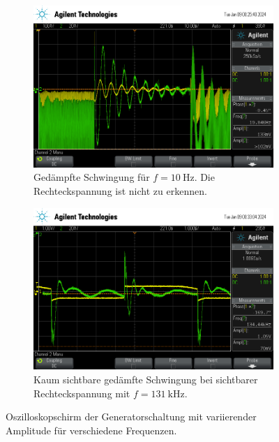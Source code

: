 \begin{figure}
  \begin{subfigure}[c]{0.49\textwidth}
    \centering
    \includegraphics[width=\textwidth]{content/scope/scope_19.png}
    \caption{Gedämpfte Schwingung für $f=\qty{10}{\hertz}$. Die Rechteckspannung ist nicht zu erkennen.}
    \label{fig:scope_generator2_a}
  \end{subfigure}
  \begin{subfigure}[c]{0.49\textwidth}
    \centering
    \includegraphics[width=\textwidth]{content/scope/scope_20.png}
    \caption{Kaum sichtbare gedämfte Schwingung bei sichtbarer Rechteckspannung mit $f=\qty{131}{\kilo\hertz}$.}
  \end{subfigure}
  \caption{Oszilloskopschirm der Generatorschaltung mit variierender Amplitude für verschiedene Frequenzen.}
  \label{fig:scope_generator2}
\end{figure}
